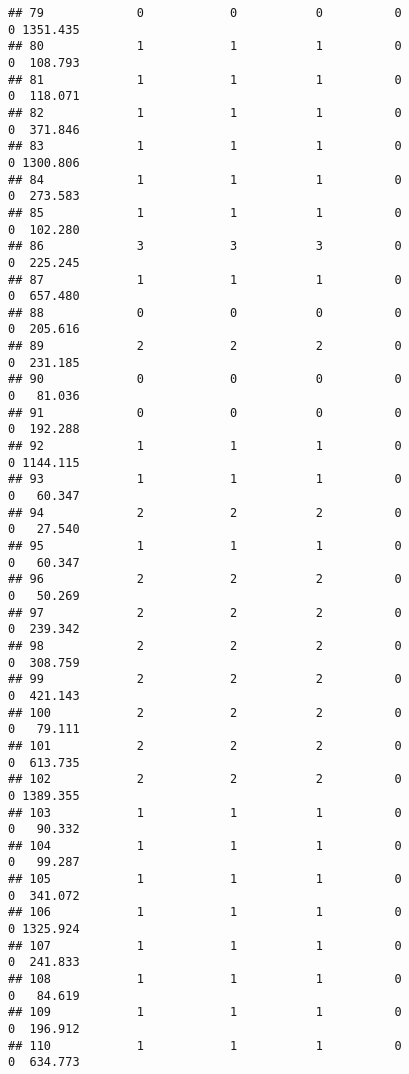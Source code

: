 \documentclass[
]{article}
\begin{document}
\begin{verbatim}
## 79             0            0           0          0                0 1351.435
## 80             1            1           1          0                0  108.793
## 81             1            1           1          0                0  118.071
## 82             1            1           1          0                0  371.846
## 83             1            1           1          0                0 1300.806
## 84             1            1           1          0                0  273.583
## 85             1            1           1          0                0  102.280
## 86             3            3           3          0                0  225.245
## 87             1            1           1          0                0  657.480
## 88             0            0           0          0                0  205.616
## 89             2            2           2          0                0  231.185
## 90             0            0           0          0                0   81.036
## 91             0            0           0          0                0  192.288
## 92             1            1           1          0                0 1144.115
## 93             1            1           1          0                0   60.347
## 94             2            2           2          0                0   27.540
## 95             1            1           1          0                0   60.347
## 96             2            2           2          0                0   50.269
## 97             2            2           2          0                0  239.342
## 98             2            2           2          0                0  308.759
## 99             2            2           2          0                0  421.143
## 100            2            2           2          0                0   79.111
## 101            2            2           2          0                0  613.735
## 102            2            2           2          0                0 1389.355
## 103            1            1           1          0                0   90.332
## 104            1            1           1          0                0   99.287
## 105            1            1           1          0                0  341.072
## 106            1            1           1          0                0 1325.924
## 107            1            1           1          0                0  241.833
## 108            1            1           1          0                0   84.619
## 109            1            1           1          0                0  196.912
## 110            1            1           1          0                0  634.773

\end{verbatim}
\end{document}
